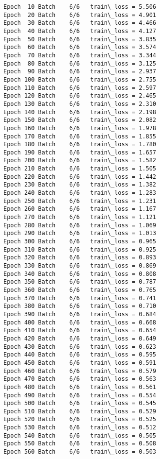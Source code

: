 \documentclass[11pt]{article}
\begin{document}
    \begin{Verbatim}[commandchars=\\\{\}]
Epoch  10 Batch    6/6   train\_loss = 5.506
Epoch  20 Batch    6/6   train\_loss = 4.901
Epoch  30 Batch    6/6   train\_loss = 4.466
Epoch  40 Batch    6/6   train\_loss = 4.127
Epoch  50 Batch    6/6   train\_loss = 3.835
Epoch  60 Batch    6/6   train\_loss = 3.574
Epoch  70 Batch    6/6   train\_loss = 3.344
Epoch  80 Batch    6/6   train\_loss = 3.125
Epoch  90 Batch    6/6   train\_loss = 2.937
Epoch 100 Batch    6/6   train\_loss = 2.755
Epoch 110 Batch    6/6   train\_loss = 2.597
Epoch 120 Batch    6/6   train\_loss = 2.465
Epoch 130 Batch    6/6   train\_loss = 2.310
Epoch 140 Batch    6/6   train\_loss = 2.198
Epoch 150 Batch    6/6   train\_loss = 2.082
Epoch 160 Batch    6/6   train\_loss = 1.978
Epoch 170 Batch    6/6   train\_loss = 1.855
Epoch 180 Batch    6/6   train\_loss = 1.780
Epoch 190 Batch    6/6   train\_loss = 1.657
Epoch 200 Batch    6/6   train\_loss = 1.582
Epoch 210 Batch    6/6   train\_loss = 1.505
Epoch 220 Batch    6/6   train\_loss = 1.442
Epoch 230 Batch    6/6   train\_loss = 1.382
Epoch 240 Batch    6/6   train\_loss = 1.283
Epoch 250 Batch    6/6   train\_loss = 1.231
Epoch 260 Batch    6/6   train\_loss = 1.167
Epoch 270 Batch    6/6   train\_loss = 1.121
Epoch 280 Batch    6/6   train\_loss = 1.069
Epoch 290 Batch    6/6   train\_loss = 1.013
Epoch 300 Batch    6/6   train\_loss = 0.965
Epoch 310 Batch    6/6   train\_loss = 0.925
Epoch 320 Batch    6/6   train\_loss = 0.893
Epoch 330 Batch    6/6   train\_loss = 0.869
Epoch 340 Batch    6/6   train\_loss = 0.808
Epoch 350 Batch    6/6   train\_loss = 0.787
Epoch 360 Batch    6/6   train\_loss = 0.765
Epoch 370 Batch    6/6   train\_loss = 0.741
Epoch 380 Batch    6/6   train\_loss = 0.710
Epoch 390 Batch    6/6   train\_loss = 0.684
Epoch 400 Batch    6/6   train\_loss = 0.668
Epoch 410 Batch    6/6   train\_loss = 0.654
Epoch 420 Batch    6/6   train\_loss = 0.649
Epoch 430 Batch    6/6   train\_loss = 0.623
Epoch 440 Batch    6/6   train\_loss = 0.595
Epoch 450 Batch    6/6   train\_loss = 0.591
Epoch 460 Batch    6/6   train\_loss = 0.579
Epoch 470 Batch    6/6   train\_loss = 0.563
Epoch 480 Batch    6/6   train\_loss = 0.561
Epoch 490 Batch    6/6   train\_loss = 0.554
Epoch 500 Batch    6/6   train\_loss = 0.545
Epoch 510 Batch    6/6   train\_loss = 0.529
Epoch 520 Batch    6/6   train\_loss = 0.525
Epoch 530 Batch    6/6   train\_loss = 0.512
Epoch 540 Batch    6/6   train\_loss = 0.505
Epoch 550 Batch    6/6   train\_loss = 0.508
Epoch 560 Batch    6/6   train\_loss = 0.503

\end{Verbatim}
\end{document}
